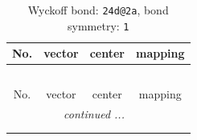 \documentclass[fleqn,8pt]{jsarticle}
\begin{document}
\renewcommand{\arraystretch}{1.2}
\begin{longtable}{cccc}
\caption{Wyckoff bond: {\tt 24d@2a}, bond symmetry: {\tt 1}}
 \\
 \hline \hline
No. & vector & center & mapping \\ \hline \endfirsthead

\multicolumn{3}{l}{\tablename\ \thetable{}} \\
 \hline \hline
No. & vector & center & mapping \\ \hline \endhead

 \hline \hline
\multicolumn{3}{r}{\footnotesize\it continued ...} \\ \endfoot

 \hline \hline
\multicolumn{3}{r}{} \\ \endlastfoot


\end{longtable}
\end{document}
